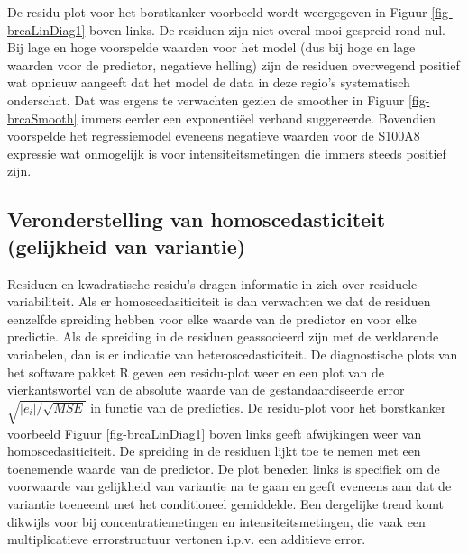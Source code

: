 \documentclass[
  dutch,
  letterpaper,
  12pt]{book}
\theoremstyle{definition}
\theoremstyle{definition}
\theoremstyle{definition}
\theoremstyle{remark}
\begin{document}
De residu plot voor het borstkanker voorbeeld wordt weergegeven in
Figuur \ref{fig-brcaLinDiag1} boven links. De residuen zijn niet overal
mooi gespreid rond nul. Bij lage en hoge voorspelde waarden voor het
model (dus bij hoge en lage waarden voor de predictor, negatieve
helling) zijn de residuen overwegend positief wat opnieuw aangeeft dat
het model de data in deze regio's systematisch onderschat. Dat was
ergens te verwachten gezien de smoother in Figuur \ref{fig-brcaSmooth}
immers eerder een exponentiëel verband suggereerde. Bovendien voorspelde
het regressiemodel eveneens negatieve waarden voor de S100A8 expressie
wat onmogelijk is voor intensiteitsmetingen die immers steeds positief
zijn.

\subsection{Veronderstelling van homoscedasticiteit (gelijkheid van
variantie)}\label{veronderstelling-van-homoscedasticiteit-gelijkheid-van-variantie}

Residuen en kwadratische residu's dragen informatie in zich over
residuele variabiliteit. Als er homoscedasiticiteit is dan verwachten we
dat de residuen eenzelfde spreiding hebben voor elke waarde van de
predictor en voor elke predictie. Als de spreiding in de residuen
geassocieerd zijn met de verklarende variabelen, dan is er indicatie van
heteroscedasticiteit. De diagnostische plots van het software pakket R
geven een residu-plot weer en een plot van de vierkantswortel van de
absolute waarde van de gestandaardiseerde error
\(\sqrt{|e_i|/\sqrt{MSE}}\) in functie van de predicties. De residu-plot
voor het borstkanker voorbeeld Figuur \ref{fig-brcaLinDiag1} boven links
geeft afwijkingen weer van homoscedasiticiteit. De spreiding in de
residuen lijkt toe te nemen met een toenemende waarde van de predictor.
De plot beneden links is specifiek om de voorwaarde van gelijkheid van
variantie na te gaan en geeft eveneens aan dat de variantie toeneemt met
het conditioneel gemiddelde. Een dergelijke trend komt dikwijls voor bij
concentratiemetingen en intensiteitsmetingen, die vaak een
multiplicatieve errorstructuur vertonen i.p.v. een additieve error.
\end{document}

